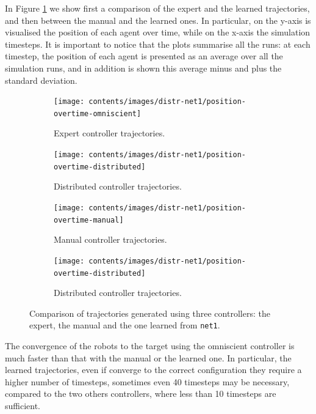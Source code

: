 In Figure \ref{fig:net1traj} we show first a comparison of the expert and the 
learned trajectories, and then between the manual and the learned ones. In 
particular, on the y-axis is visualised the position of each agent over time, while 
on the x-axis the simulation timesteps. It is important to notice that the plots 
summarise all the runs: at each timestep, the position of each agent is presented 
as an average over all the simulation runs, and in addition is  shown this average 
minus and plus the standard deviation.
\begin{figure}[!htb]
	\centering
	\begin{subfigure}[h]{0.49\textwidth}
		\centering
		\texttt{[image: contents/images/distr-net1/position-overtime-omniscient]}%
		\caption{Expert controller trajectories.}
	\end{subfigure}
	\hfill
	\begin{subfigure}[h]{0.49\textwidth}
		\centering
		\texttt{[image: contents/images/distr-net1/position-overtime-distributed]}
		\caption{Distributed controller trajectories.}
	\end{subfigure}
	\hspace*{\fill}%
	
	\vspace*{8pt}%
	
	\hspace*{\fill}%
	\begin{subfigure}[h]{0.49\textwidth}
		\centering
		\texttt{[image: contents/images/distr-net1/position-overtime-manual]}%
		\caption{Manual controller trajectories.}
	\end{subfigure}
	\hfill
	\begin{subfigure}[h]{0.49\textwidth}
		\centering
		\texttt{[image: contents/images/distr-net1/position-overtime-distributed]}
		\caption{Distributed controller trajectories.}
	\end{subfigure}
	\caption[Evaluation of the trajectories learned by \texttt{net1}.]{Comparison 
		of trajectories generated using three controllers: the expert, the manual and 
		the one learned from \texttt{net1}.}
	\label{fig:net1traj}
\end{figure}

The convergence of the robots to the target using the omniscient controller is 
much faster than that with the manual or the learned one. In particular, the 
learned trajectories, even if converge to the correct configuration they require a 
higher number of timesteps, sometimes even 40 timesteps may be necessary, 
compared to the two others controllers, where less than 10 timesteps are 
sufficient.

